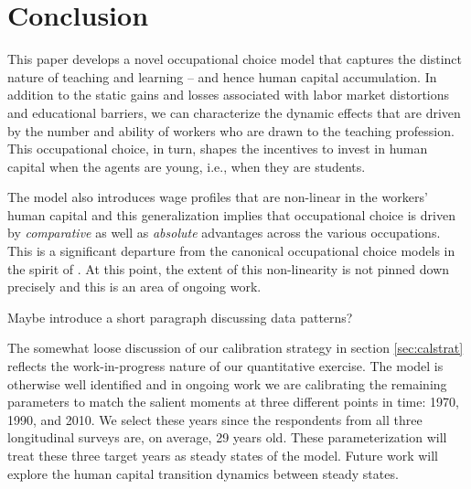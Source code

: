 \documentclass[onehalfspacing,11pt]{article}
\begin{document}


\newpage
\section{Conclusion}\label{sec:conclusion}
This paper develops a novel occupational choice model that captures the distinct nature of teaching and learning -- and hence human capital accumulation. In addition to the static gains and losses associated with labor market distortions and educational barriers, we can characterize the dynamic effects that are driven by the number and ability of workers who are drawn to the teaching profession. This occupational choice, in turn, shapes the incentives to invest in human capital when the agents are young, i.e., when they are students.

The model also introduces wage profiles that are non-linear in the workers' human capital and this generalization implies that occupational choice is driven by {\it comparative} as well as {\it absolute} advantages across the various occupations. This is a significant departure from the canonical occupational choice models in the spirit of \cite{Roy:1951}. At this point, the extent of this non-linearity is not pinned down precisely and this is an area of ongoing work.

{\sc Maybe introduce a short paragraph discussing data patterns?}

The somewhat loose discussion of our calibration strategy in section \ref{sec:calstrat} reflects the work-in-progress nature of our quantitative exercise. The model is otherwise well identified and in ongoing work we are calibrating the remaining parameters to match the salient moments at three different points in time: 1970, 1990, and 2010. We select these years since the respondents from all three longitudinal surveys are, on average, 29 years old. These parameterization will treat these three target years as steady states of the model. Future work will explore the human capital transition dynamics between steady states.
\end{document}

